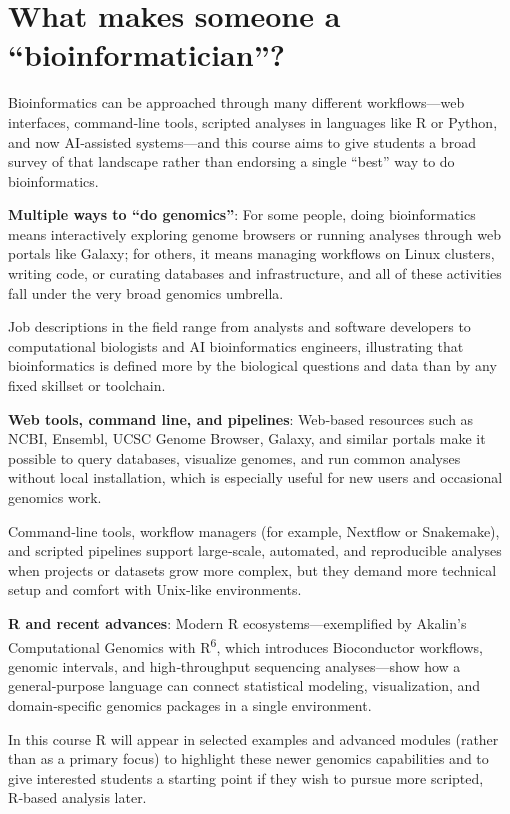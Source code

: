 \documentclass[
  letterpaper,
  DIV=11,
  numbers=noendperiod]{scrreprt}
\begin{document}
\section{What makes someone a
``bioinformatician''?}\label{what-makes-someone-a-bioinformatician}

Bioinformatics can be approached through many different workflows---web
interfaces, command‑line tools, scripted analyses in languages like R or
Python, and now AI‑assisted systems---and this course aims to give
students a broad survey of that landscape rather than endorsing a single
``best'' way to do bioinformatics.

\textbf{Multiple ways to ``do genomics''}: For some people, doing
bioinformatics means interactively exploring genome browsers or running
analyses through web portals like Galaxy; for others, it means managing
workflows on Linux clusters, writing code, or curating databases and
infrastructure, and all of these activities fall under the very broad
genomics umbrella.

Job descriptions in the field range from analysts and software
developers to computational biologists and AI bioinformatics engineers,
illustrating that bioinformatics is defined more by the biological
questions and data than by any fixed skillset or toolchain.

\textbf{Web tools, command line, and pipelines}: Web‑based resources
such as NCBI, Ensembl, UCSC Genome Browser, Galaxy, and similar portals
make it possible to query databases, visualize genomes, and run common
analyses without local installation, which is especially useful for new
users and occasional genomics work.

Command‑line tools, workflow managers (for example, Nextflow or
Snakemake), and scripted pipelines support large‑scale, automated, and
reproducible analyses when projects or datasets grow more complex, but
they demand more technical setup and comfort with Unix‑like
environments.

\textbf{R and recent advances}: Modern R ecosystems---exemplified by
Akalin's Computational Genomics with R\textsuperscript{6}, which
introduces Bioconductor workflows, genomic intervals, and
high‑throughput sequencing analyses---show how a general‑purpose
language can connect statistical modeling, visualization, and
domain‑specific genomics packages in a single environment.

In this course R will appear in selected examples and advanced modules
(rather than as a primary focus) to highlight these newer genomics
capabilities and to give interested students a starting point if they
wish to pursue more scripted, R‑based analysis later.
\end{document}
